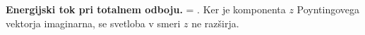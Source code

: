 \begin{example}{\bf Energijski tok pri totalnem odboju.}
\left[
\begin{array}{c}
0\\
1\\
0\\
\end{array}
\right] \times 
{}
 = 
\!\!.
 \label{eq:04_70}
\eeq
Ker je komponenta $z$ Poyntingovega vektorja imaginarna, se svetloba v smeri $z$ ne razširja. 


\end{example}
